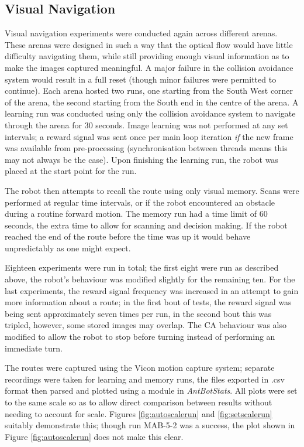 \documentclass[a4paper,12pt]{article}
\begin{document}
\subsection{Visual Navigation}
Visual navigation experiments were conducted again across different arenas. These arenas were designed in such a way that the optical
flow would have little difficulty navigating them, while still providing enough visual information as to make the images captured
meaningful. A major failure in the collision avoidance system would result in a full reset (though minor failures were permitted to
continue). Each arena hosted two runs, one starting from the South West corner of the arena, the second starting from the South end
in the centre of the arena. A learning run was conducted using only the collision avoidance system to navigate through the arena
for 30 seconds. Image learning was not performed at any set intervals; a reward signal was sent once per main loop iteration \textit{if}
the new frame was available from pre-processing (synchronisation between threads means this may not always be the case). Upon finishing
the learning run, the robot was placed at the start point for the run.
\newline

The robot then attempts to recall the route using only visual memory. Scans were performed at regular time intervals, or if the robot
encountered an obstacle during a routine forward motion. The memory run had a time limit of 60 seconds, the extra time to allow for
scanning and decision making. If the robot reached the end of the route before the time was up it would behave
unpredictably as one might expect.
\newline

Eighteen experiments were run in total; the first eight were run as described above, the robot's behaviour was modified slightly
for the remaining ten. For the last experiments, the reward signal frequency was increased in an attempt to gain more information
about a route; in the first bout of tests, the reward signal was being sent approximately seven times per run, in the second bout
this was tripled, however, some stored images may overlap. The CA behaviour was also modified to allow the robot to stop before
turning instead of performing an immediate turn.
\newline

The routes were captured using the Vicon motion capture system; separate recordings were taken for learning and memory runs, the
files exported in .csv format then parsed and plotted using a module in \textit{AntBotStats}. All plots were set to the same scale
so as to allow direct comparison between results without needing to account for scale. Figures \ref{fig:autoscalerun} and \ref{fig:setscalerun}
suitably demonstrate this; though run MAB-5-2 was a success, the plot shown in Figure \ref{fig:autoscalerun} does not make this clear.
\end{document}
